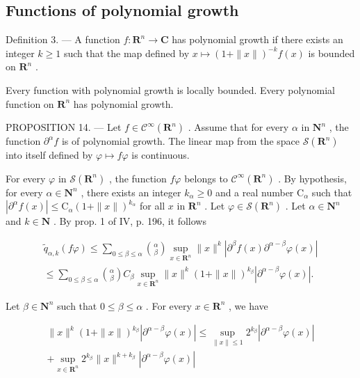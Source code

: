 \subsection{Functions of polynomial growth}

Definition 3. --- A function \(f\colon\mathbf{R}^{n}\to\mathbf{C}\) has polynomial growth if there exists an integer \(k\geqslant1\) such that the map defined by \(x\mapsto(1+\|x\|)^{-k}f(x)\) is bounded on \(\mathbf{R}^{n}\) .

Every function with polynomial growth is locally bounded. Every polynomial function on \(\mathbf{R}^{n}\) has polynomial growth.

PROPOSITION 14. --- Let \(f \in \mathcal{C}^{\infty}(\mathbf{R}^{n})\) . Assume that for every \(\alpha\) in \(\mathbf{N}^{n}\) , the function \(\partial^{\alpha}f\) is of polynomial growth. The linear map from the space \(\mathcal{S}(\mathbf{R}^{n})\) into itself defined by \(\varphi \mapsto f\varphi\) is continuous.

For every \(\varphi\) in \(\mathcal{S}(\mathbf{R}^{n})\) , the function \(f\varphi\) belongs to \(\mathcal{C}^{\infty}(\mathbf{R}^{n})\) . By hypothesis, for every \(\alpha \in \mathbf{N}^{n}\) , there exists an integer \(k_{\alpha} \geqslant 0\) and a real number \(\mathrm{C}_{\alpha}\) such that \(|\partial^{\alpha}f(x)| \leqslant \mathrm{C}_{\alpha}(1 + \|x\|)^{k_{\alpha}}\) for all \(x\) in \(\mathbf{R}^{n}\) . Let \(\varphi \in \mathcal{S}(\mathbf{R}^{n})\) . Let \(\alpha \in \mathbf{N}^{n}\) and \(k \in \mathbf{N}\) . By prop. 1 of IV, p. 196, it follows

\[
\begin{array}{l} \widetilde {q} _ {\alpha , k} (f \varphi) \leqslant \sum_ {0 \leqslant \beta \leqslant \alpha} \binom {\alpha} {\beta} \sup _ {x \in \mathbf {R} ^ {n}} \| x \| ^ {k} | \partial^ {\beta} f (x)   \partial^ {\alpha - \beta} \varphi (x) | \\ \leqslant \sum_ {0 \leqslant \beta \leqslant \alpha} \binom {\alpha} {\beta} C _ {\beta} \sup _ {x \in \mathbf {R} ^ {n}} \| x \| ^ {k} (1 + \| x \|) ^ {k _ {\beta}} | \partial^ {\alpha - \beta} \varphi (x) |. \end{array}
\]

Let \(\beta \in \mathbf{N}^n\) such that \(0 \leqslant \beta \leqslant \alpha\) . For every \(x \in \mathbf{R}^n\) , we have

\[
\begin{array}{c} \| x \| ^ {k} (1 + \| x \|) ^ {k _ {\beta}} | \partial^ {\alpha - \beta} \varphi (x) | \leqslant \sup _ {\| x \| \leqslant 1} 2 ^ {k _ {\beta}} | \partial^ {\alpha - \beta} \varphi (x) | \\ + \sup _ {x \in \mathbf {R} ^ {n}} 2 ^ {k _ {\beta}} \| x \| ^ {k + k _ {\beta}} | \partial^ {\alpha - \beta} \varphi (x) | \end{array}
\]


